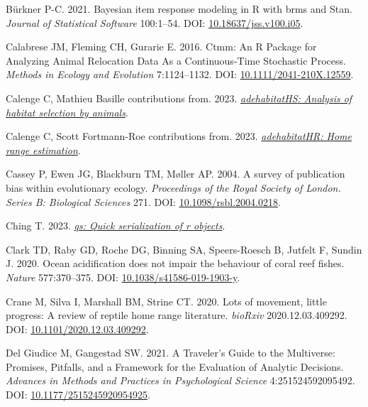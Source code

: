 \documentclass[10pt,a4paper]{article}
\newlength{\cslhangindent}
\newenvironment{CSLReferences}[2] %
 {\begin{list}{}{%
  \setlength{\itemindent}{0pt}
  \setlength{\leftmargin}{0pt}
  \setlength{\parsep}{0pt}
  \ifodd #1
   \setlength{\leftmargin}{\cslhangindent}
   \setlength{\itemindent}{-1\cslhangindent}
  \fi
  \setlength{\itemsep}{#2\baselineskip}}}
 {\end{list}}
\begin{document}
\begin{CSLReferences}{1}{0}
Bürkner P-C. 2021. Bayesian item response modeling in {R} with {brms} and {Stan}. \emph{Journal of Statistical Software} 100:1--54. DOI: \href{https://doi.org/10.18637/jss.v100.i05}{10.18637/jss.v100.i05}.

Calabrese JM, Fleming CH, Gurarie E. 2016. Ctmm: An {R} {Package} for {Analyzing} {Animal} {Relocation} {Data} {As} a {Continuous}-{Time} {Stochastic} {Process}. \emph{Methods in Ecology and Evolution} 7:1124--1132. DOI: \href{https://doi.org/10.1111/2041-210X.12559}{10.1111/2041-210X.12559}.

Calenge C, Mathieu Basille contributions from. 2023. \emph{\href{https://CRAN.R-project.org/package=adehabitatHS}{{adehabitatHS}: Analysis of habitat selection by animals}}.

Calenge C, Scott Fortmann-Roe contributions from. 2023. \emph{\href{https://CRAN.R-project.org/package=adehabitatHR}{{adehabitatHR}: Home range estimation}}.

Cassey P, Ewen JG, Blackburn TM, Møller AP. 2004. A survey of publication bias within evolutionary ecology. \emph{Proceedings of the Royal Society of London. Series B: Biological Sciences} 271. DOI: \href{https://doi.org/10.1098/rsbl.2004.0218}{10.1098/rsbl.2004.0218}.

Ching T. 2023. \emph{\href{https://CRAN.R-project.org/package=qs}{{qs}: Quick serialization of r objects}}.

Clark TD, Raby GD, Roche DG, Binning SA, Speers-Roesch B, Jutfelt F, Sundin J. 2020. Ocean acidification does not impair the behaviour of coral reef fishes. \emph{Nature} 577:370--375. DOI: \href{https://doi.org/10.1038/s41586-019-1903-y}{10.1038/s41586-019-1903-y}.

Crane M, Silva I, Marshall BM, Strine CT. 2020. Lots of movement, little progress: {A} review of reptile home range literature. \emph{bioRxiv} 2020.12.03.409292. DOI: \href{https://doi.org/10.1101/2020.12.03.409292}{10.1101/2020.12.03.409292}.

Del Giudice M, Gangestad SW. 2021. A {Traveler}'s {Guide} to the {Multiverse}: {Promises}, {Pitfalls}, and a {Framework} for the {Evaluation} of {Analytic} {Decisions}. \emph{Advances in Methods and Practices in Psychological Science} 4:251524592095492. DOI: \href{https://doi.org/10.1177/2515245920954925}{10.1177/2515245920954925}.


\end{CSLReferences}
\end{document}
